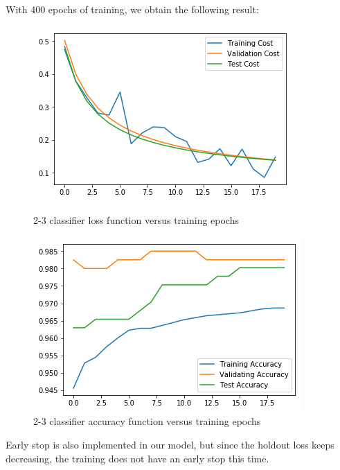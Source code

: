 \documentclass{article}
\begin{document}
With 400 epochs of training, we obtain the following result:
\begin{figure}[h]
	\begin{minipage}{0.48\textwidth}
	\centering
	\includegraphics[width=\textwidth]{pics/2_3_loss.png}
	\caption{2-3 classifier loss function versus training epochs}
	\end{minipage}\hfill
	\begin{minipage}{0.48\textwidth}
	\centering
	\includegraphics[width=\textwidth]{pics/2_3_accuracy.png}
	\caption{2-3 classifier accuracy function versus training epochs}
\end{minipage}
	
\end{figure}

Early stop is also implemented in our model, but since the holdout loss keeps decreasing, the training does not have an early stop this time. 
\end{document}
